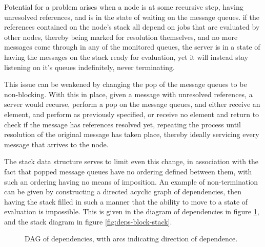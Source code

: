 \documentclass[a4paper,10pt]{article}
\begin{document}
Potential for a problem arises when a node is at some recursive step, having
unresolved references, and is in the state of waiting on the message queues.
if the references contained on the node's stack all depend on jobs that are
evaluated by other nodes, thereby being marked for resolution themselves, and
no more messages come through in any of the monitored queues, the server is in
a state of having the messages on the stack ready for evaluation, yet it will
instead stay listening on it's queues indefinitely, never terminating.

This issue can be weakened by changing the pop of the message queues to be
non-blocking.
With this in place, given a message with unresolved references, a server would
recurse, perform a pop on the message queues, and either receive an element,
and perform as previously specified, or receive no element and return to check
if the message has references resolved yet, repeating the process until
resolution of the original message has taken place, thereby ideally servicing
every message that arrives to the node.

The stack data structure serves to limit even this change, in association with
the fact that popped message queues have no ordering defined between them, with
such an ordering having no means of imposition.
An example of non-termination can be given by constructing a directed acyclic
graph of dependencies, then having the stack filled in such a manner that the
ability to move to a state of evaluation is impossible.
This is given in the diagram of dependencies in figure \ref{fig:deps}, and the
stack diagram in figure \ref{fig:deps-block-stack}.

\begin{figure}
	\centering
	\caption{\label{fig:deps}DAG of dependencies, with arcs indicating
	direction of dependence.}
\end{figure}
\end{document}
